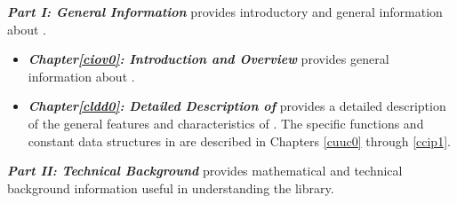 \emph{\textbf{Part I: General Information}} provides introductory
and general information about \emph{\productbasenameshort{}}.

\begin{itemize}
\item \emph{\textbf{Chapter\postchapterwordnonstretchable{}\ref{ciov0}: 
      Introduction and Overview}} provides general information
      about \emph{\productbasenameshort{}}.  
\item \emph{\textbf{Chapter\postchapterwordnonstretchable{}\ref{cldd0}: 
      Detailed Description of \productbasenameshort{}}}
      provides a detailed description 
      of the general features and characteristics
      of \emph{\productbasenameshort{}}\@.  The specific
      functions and constant data structures 
      in \emph{\productbasenameshort{}} are described in
      Chapters \ref{cuuc0} through \ref{ccip1}.
\end{itemize}

\emph{\textbf{Part II: Technical Background}} provides mathematical and 
technical background information useful in understanding the library.  

